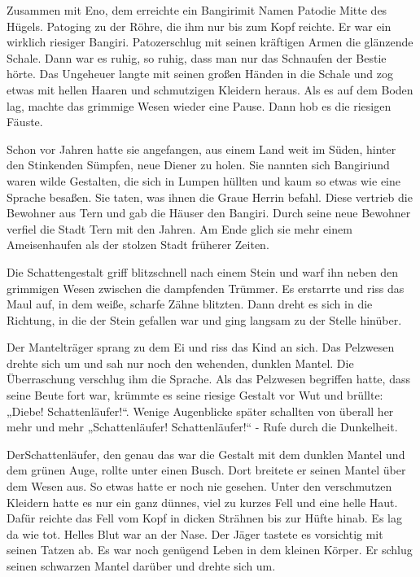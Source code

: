 \documentclass[12pt,a4paper,onecolumn,twoside,ngerman]{book}
\newcommand{\Tern}{Tern }
\newcommand{\Bangiri}{Bangiri}
\newcommand{\Pato}{Pato}
\newcommand{\Schattenjager}{Schattenläufer}
\newcommand{\Eno}{Eno}
\begin{document}
Zusammen mit \Eno{,} dem \Schatterjager{,} erreichte ein \Bangiri mit Namen \Pato die Mitte des Hügels.  \Pato ging zu der Röhre, die ihm nur bis zum Kopf reichte. Er war ein wirklich riesiger \Bangiri{.} \Pato zerschlug mit seinen kräftigen Armen die glänzende Schale. Dann war es ruhig, so ruhig, dass man nur das Schnaufen der Bestie hörte. Das Ungeheuer langte mit seinen großen Händen in die Schale und zog etwas mit hellen Haaren und schmutzigen Kleidern heraus. Als es auf dem Boden lag, machte das grimmige Wesen wieder eine Pause. Dann hob es die riesigen Fäuste. 

 Schon vor Jahren hatte sie angefangen, aus einem Land weit im Süden, hinter den Stinkenden Sümpfen, neue Diener zu holen. Sie nannten sich \Bangiri und waren wilde Gestalten, die sich in Lumpen hüllten und kaum so etwas wie eine Sprache besaßen. Sie taten, was ihnen die Graue Herrin befahl. Diese vertrieb die Bewohner aus \Tern und gab die Häuser den \Bangiri. Durch seine neue Bewohner verfiel die Stadt \Tern mit den Jahren. Am Ende glich sie mehr einem Ameisenhaufen als der stolzen Stadt früherer Zeiten.

Die Schattengestalt griff blitzschnell nach einem Stein und warf ihn neben den grimmigen Wesen zwischen die dampfenden Trümmer. Es erstarrte und riss das Maul auf, in dem weiße, scharfe Zähne blitzten. Dann dreht es sich in die Richtung, in die der Stein gefallen war und ging langsam zu der Stelle hinüber. 

Der Mantelträger sprang zu dem Ei und riss das Kind an sich. Das Pelzwesen drehte sich um und sah nur noch den wehenden, dunklen Mantel. Die Überraschung verschlug ihm die Sprache. Als das Pelzwesen begriffen hatte, dass seine Beute fort war, krümmte es seine riesige Gestalt vor Wut und brüllte: „Diebe! \Schattenjager!“. Wenige Augenblicke später schallten von überall her mehr und mehr „\Schattenjager! \Schattenjager!“ - Rufe durch die Dunkelheit.

Der\Schattenjager, den genau das war die Gestalt mit dem dunklen Mantel und dem grünen Auge, rollte unter einen Busch. Dort breitete er seinen Mantel über dem Wesen aus. So etwas hatte er noch nie gesehen. Unter den verschmutzen Kleidern hatte es nur ein ganz dünnes, viel zu kurzes Fell und eine helle Haut. Dafür reichte das Fell vom Kopf in dicken Strähnen bis zur Hüfte hinab. Es lag da wie tot. Helles Blut war an der Nase. Der Jäger tastete es vorsichtig mit seinen Tatzen ab. Es war noch genügend Leben in dem kleinen Körper. Er schlug seinen schwarzen Mantel darüber und drehte sich um.
\end{document}
